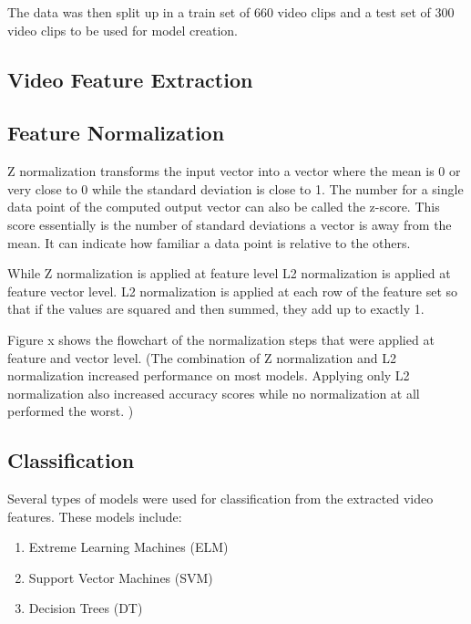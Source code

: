 The data was then split up in a train set of 660 video clips and a test set of 300 video clips to be used for model creation. 

\subsection{Video Feature Extraction}
\label{subsection:featureextraction}

\subsection{Feature Normalization}
\label{subsection:normalization}
Z normalization transforms the input vector into a vector where the mean is 0 or very close to 0 while the standard deviation is close to 1. The number for a single data point of the computed output vector can also be called the z-score. This score essentially is the number of standard deviations a vector is away from the mean. It can indicate how familiar a data point is relative to the others. 

While Z normalization is applied at feature level L2 normalization is applied at feature vector level. L2 normalization is applied at each row of the feature set so that if the values are squared and then summed, they add up to exactly 1. 

Figure x shows the flowchart of the normalization steps that were applied at feature and vector level. (The combination of Z normalization and L2 normalization increased performance on most models. Applying only L2 normalization also increased accuracy scores while no normalization at all performed the worst. )

\subsection{Classification}
\label{subsection:classificaiton}
Several types of models were used for classification from the extracted video features. These models include:
\begin{enumerate}
\item Extreme Learning Machines (ELM)
\item Support Vector Machines (SVM)
\item Decision Trees (DT)
\end{enumerate}





